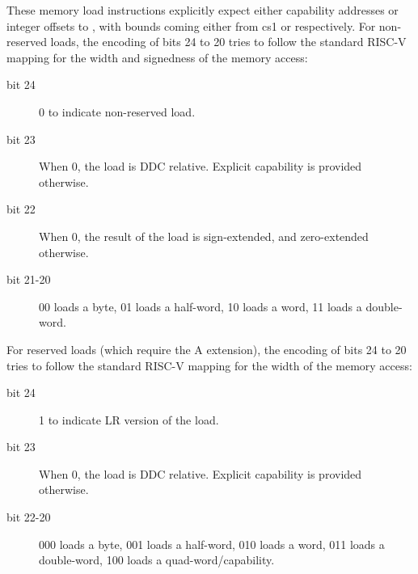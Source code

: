 {		


		\vspace{1.5ex}






		\rvcheriheader









These memory load instructions explicitly expect either capability addresses
or integer offsets to \DDC{}, with bounds coming either from cs1 or \DDC{}
respectively. For non-reserved loads, the encoding of bits 24 to 20 tries to
follow the standard RISC-V mapping for the width and signedness of the memory
access:
\begin{description}
\item [bit 24] 0 to indicate non-reserved load.
\item [bit 23] When 0, the load is DDC relative. Explicit capability is provided otherwise.
\item [bit 22] When 0, the result of the load is sign-extended, and zero-extended otherwise.
\item [bit 21-20] 00 loads a byte, 01 loads a half-word, 10 loads a word, 11 loads a double-word.
\end{description}

For reserved loads (which require the A extension), the encoding of bits 24 to
20 tries to follow the standard RISC-V mapping for the width of the memory
access:
\begin{description}
\item [bit 24] 1 to indicate LR version of the load.
\item [bit 23] When 0, the load is DDC relative. Explicit capability is provided otherwise.
\item [bit 22-20] 000 loads a byte, 001 loads a half-word, 010 loads a word, 011 loads a double-word, 100 loads a quad-word/capability.
\end{description}

}
